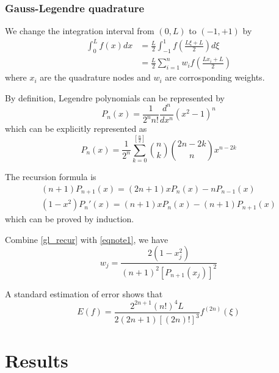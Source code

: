 \documentclass[conference,onecolumn,12pt]{IEEEtran}
\theoremstyle{definition}
\begin{document}
\subsubsection{Gauss-Legendre quadrature}
We change the integration interval from $(0,L)$ to $(-1,+1)$ by
\begin{equation}
    \begin{split}
        \int_0^L f(x) dx &= \frac{L}{2}\int_{-1}^1 f(\frac{L\xi + L}{2}) d\xi\\
        & = \frac{L}{2}\sum_{i=1}^n w_i f\left(
            \frac{Lx_i+L}{2}
        \right)
    \end{split}
\end{equation}
where $x_i$ are the quadrature nodes and $w_i$ are corrosponding weights.

By definition, Legendre polynomials can be represented by
\begin{equation}
    P_n(x) = \frac{1}{2^n n!}\frac{d^n}{dx^n}(x^2-1)^n
\end{equation}
which can be explicitly represented as
\begin{equation}
    P_n(x) = \frac{1}{2^n}\sum_{k=0}^{\left[\frac{n}{2}\right]}\binom{n}{k}\binom{2n-2k}{n}x^{n-2k}
\end{equation}

The recursion formula is 
\begin{equation}
    \label{gl_recur}
    \begin{split}
        (n+1)P_{n+1}(x)=(2n+1)xP_n(x)-nP_{n-1}(x)\\
        (1-x^2)P_n'(x) = (n+1)xP_n(x)-(n+1)P_{n+1}(x)
    \end{split}
\end{equation}
which can be proved by induction. 

Combine \ref{gl_recur} with \ref{eqnote1}, we have
\begin{equation}
    w_j = \frac{2(1-x_j^2)}{(n+1)^2[P_{n+1}(x_j)]^2}
\end{equation}

A standard estimation of error shows that
\begin{equation}
    E(f) = \frac{2^{2n+1}(n!)^4L}{2(2n+1)[(2n)!]^3}f^{(2n)}(\xi)
\end{equation}
\section{Results}
\end{document}
